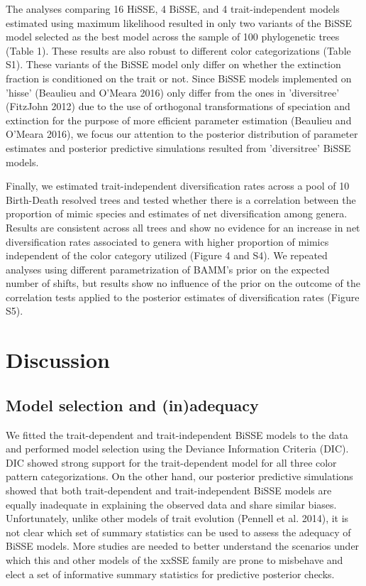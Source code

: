 The analyses comparing 16 HiSSE, 4 BiSSE, and 4 trait-independent models estimated using maximum likelihood resulted in only two variants of the BiSSE model selected as the best model across the sample of 100 phylogenetic trees (Table 1). These results are also robust to different color categorizations (Table S1). These variants of the BiSSE model only differ on whether the extinction fraction is conditioned on the trait or not. Since BiSSE models implemented on 'hisse' (Beaulieu and O'Meara 2016) only differ from the ones in 'diversitree' (FitzJohn 2012) due to the use of orthogonal transformations of speciation and extinction for the purpose of more efficient parameter estimation (Beaulieu and O'Meara 2016), we focus our attention to the posterior distribution of parameter estimates and posterior predictive simulations resulted from 'diversitree' BiSSE models.

Finally, we estimated trait-independent diversification rates across a pool of 10 Birth-Death resolved trees and tested whether there is a correlation between the proportion of mimic species and estimates of net diversification among genera. Results are consistent across all trees and show no evidence for an increase in net diversification rates associated to genera with higher proportion of mimics independent of the color category utilized (Figure 4 and S4). We repeated analyses using different parametrization of BAMM's prior on the expected number of shifts, but results show no influence of the prior on the outcome of the correlation tests applied to the posterior estimates of diversification rates (Figure S5).

\section{Discussion}

\subsection{Model selection and (in)adequacy}

We fitted the trait-dependent and trait-independent BiSSE models to the data and performed model selection using the Deviance Information Criteria (DIC). DIC showed strong support for the trait-dependent model for all three color pattern categorizations. On the other hand, our posterior predictive simulations showed that both trait-dependent and trait-independent BiSSE models are equally inadequate in explaining the observed data and share similar biases. Unfortunately, unlike other models of trait evolution (Pennell et al. 2014), it is not clear which set of summary statistics can be used to assess the adequacy of BiSSE models. More studies are needed to better understand the scenarios under which this and other models of the xxSSE family are prone to misbehave and elect a set of informative summary statistics for predictive posterior checks.

